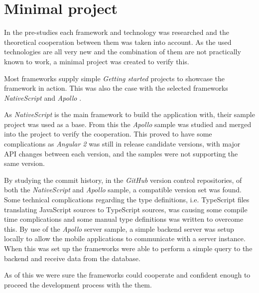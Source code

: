 \chapter{Minimal project}
In the pre-studies each framework and technology was researched and the theoretical cooperation between them was taken into account.
As the used technologies are all very new and the combination of them are not practically known to work, a minimal project was created to verify this.

Most frameworks supply simple \textit{Getting started} projects to showcase the framework in action.
This was also the case with the selected frameworks \textit{NativeScript} \citep{minimalProject:sample:nativescript} and \textit{Apollo} \citep{minimalProject:sample:apollo}.

As \textit{NativeScript} is the main framework to build the application with, their sample project was used as a base.
From this the \textit{Apollo} sample was studied and merged into the project to verify the cooperation.
This proved to have some complications as \textit{Angular 2} was still in release candidate versions, with major API changes between each version, and the samples were not supporting the same version.

By studying the commit history, in the \textit{GitHub} version control repositories, of both the \textit{NativeScript} and \textit{Apollo} sample, a compatible version set was found.
Some technical complications regarding the type definitions, i.e. TypeScript files translating JavaScript sources to TypeScript sources, was causing some compile time complications and some manual type definitions was written to overcome this.
By use of the \textit{Apollo} server sample, a simple backend server was setup locally to allow the mobile applications to communicate with a server instance.
When this was set up the frameworks were able to perform a simple query to the backend and receive data from the database.

As of this we were sure the frameworks could cooperate and confident enough to proceed the development process with the them.